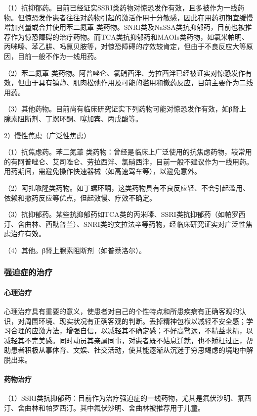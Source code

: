 （1）抗抑郁药。目前已经证实SSRI类药物对惊恐发作有效，且多被作为一线药物。但惊恐发作患者往往对药物引起的激活作用十分敏感，因此在用药初期宜缓慢增加剂量或合并使用苯二氮䓬
类药物。SNRI类及NaSSA类抗抑郁药，目前也被推荐作为惊恐障碍的治疗药物。而TCA类抗抑郁药和MAOIs类药物，如氯米帕明、丙咪嗪、苯乙肼、吗氯贝胺等，对惊恐障碍的疗效较肯定，但由于不良反应大等原因，目前一般不作为一线用药。

（2）苯二氮䓬
类药物。阿普唑仑、氯硝西泮、劳拉西泮已经被证实对惊恐发作有效，但由于具有镇静、肌肉松弛作用及可能的滥用和撤药反应，目前主要作为二线用药。

（3）其他药物。目前尚有临床研究证实下列药物可能对惊恐发作有效，如β肾上腺素阻断剂、丁螺环酮、噻加宾、丙戊酸等。

2）慢性焦虑（广泛性焦虑）

（1）抗焦虑药。苯二氮䓬
类药物：曾经是临床上广泛使用的抗焦虑药物，较常用的有阿普唑仑、艾司唑仑、劳拉西泮、氯硝西泮，目前一般不建议作为一线用药。用药期间，需避免操作快速器械（如高速驾车等），以避免意外。

（2）阿扎哌隆类药物。如丁螺环酮，这类药物具有不良反应轻、不会引起滥用、依赖和撤药反应等优点，但起效慢、疗效不确定。

（3）抗抑郁药。某些抗抑郁药如TCA类的丙米嗪、SSRI类抗抑郁药（如帕罗西汀、舍曲林、西酞普兰）、SNRI类的文拉法辛等药物，经临床研究证实对广泛性焦虑治疗有效。

（4）其他。β肾上腺素阻断剂（如普萘洛尔）。

\subsubsection{强迫症的治疗}
\paragraph{心理治疗}

心理治疗具有重要的意义，使患者对自己的个性特点和所患疾病有正确客观的认识，对周围环境、现实状况有正确客观的判断。丢掉精神包袱以减轻不安全感；学习合理的应激方法，增强自信，以减轻其不确定感；不好高骛远，不精益求精，以减轻其不完美感。同时动员其亲属同事，对患者既不姑息迁就，也不矫枉过正，帮助患者积极从事体育、文娱、社交活动，使其能逐渐从沉迷于穷思竭虑的境地中解脱出来。
\paragraph{药物治疗}

（1）SSRI类抗抑郁药：目前作为治疗强迫症的一线药物，尤其是氟伏沙明、氟西汀、舍曲林和帕罗西汀。其中氟伏沙明、舍曲林被推荐用于儿童。

